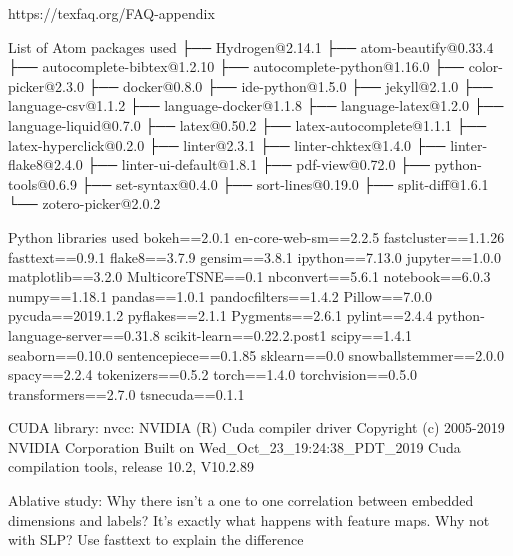 
https://texfaq.org/FAQ-appendix

List of Atom packages used
├── Hydrogen@2.14.1
├── atom-beautify@0.33.4
├── autocomplete-bibtex@1.2.10
├── autocomplete-python@1.16.0
├── color-picker@2.3.0
├── docker@0.8.0
├── ide-python@1.5.0
├── jekyll@2.1.0
├── language-csv@1.1.2
├── language-docker@1.1.8
├── language-latex@1.2.0
├── language-liquid@0.7.0
├── latex@0.50.2
├── latex-autocomplete@1.1.1
├── latex-hyperclick@0.2.0
├── linter@2.3.1
├── linter-chktex@1.4.0
├── linter-flake8@2.4.0
├── linter-ui-default@1.8.1
├── pdf-view@0.72.0
├── python-tools@0.6.9
├── set-syntax@0.4.0
├── sort-lines@0.19.0
├── split-diff@1.6.1
└── zotero-picker@2.0.2


Python libraries used
bokeh==2.0.1
en-core-web-sm==2.2.5
fastcluster==1.1.26
fasttext==0.9.1
flake8==3.7.9
gensim==3.8.1
ipython==7.13.0
jupyter==1.0.0
matplotlib==3.2.0
MulticoreTSNE==0.1
nbconvert==5.6.1
notebook==6.0.3
numpy==1.18.1
pandas==1.0.1
pandocfilters==1.4.2
Pillow==7.0.0
pycuda==2019.1.2
pyflakes==2.1.1
Pygments==2.6.1
pylint==2.4.4
python-language-server==0.31.8
scikit-learn==0.22.2.post1
scipy==1.4.1
seaborn==0.10.0
sentencepiece==0.1.85
sklearn==0.0
snowballstemmer==2.0.0
spacy==2.2.4
tokenizers==0.5.2
torch==1.4.0
torchvision==0.5.0
transformers==2.7.0
tsnecuda==0.1.1


CUDA library:
nvcc: NVIDIA (R) Cuda compiler driver
Copyright (c) 2005-2019 NVIDIA Corporation
Built on Wed_Oct_23_19:24:38_PDT_2019
Cuda compilation tools, release 10.2, V10.2.89


Ablative study: Why there isn't a one to one correlation between embedded dimensions and labels?
It's exactly what happens with feature maps. Why not with SLP? Use fasttext to explain the difference

